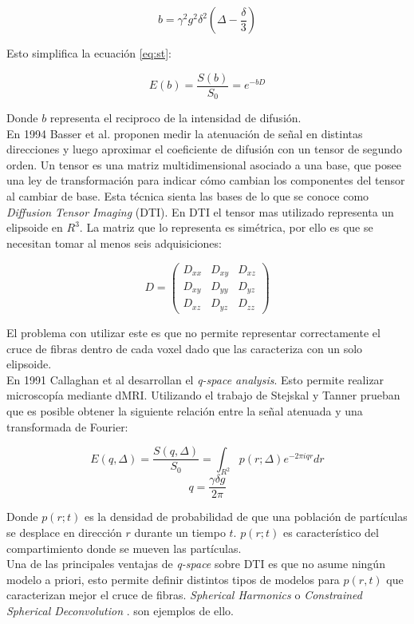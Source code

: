 $$ b = \gamma^2 g^2 \delta^2 \left(\Delta - \frac{\delta}{3}\right) $$ 

Esto simplifica la ecuaci\'on \ref{eq:st}:  

$$ E(b) = \frac{S(b)}{S_0} = e^{-b D} $$

Donde $b$ representa el reciproco de la intensidad de difusi\'on. \\

En 1994 Basser et al. \cite{Basser1994} proponen medir la atenuaci\'on de se\~nal
en distintas direcciones y luego aproximar el coeficiente de difusi\'on con un 
tensor de segundo orden. Un tensor es una matriz multidimensional asociado a una
base, que posee una ley de transformaci\'on  para indicar  c\'omo cambian los 
componentes del tensor al cambiar de base. Esta t\'ecnica sienta las bases de lo
que se conoce como \textit{Diffusion Tensor Imaging} (DTI). En DTI el tensor 
mas utilizado representa un elipsoide en $R^3$. La matriz que lo representa
es  sim\'etrica, por ello es que se necesitan tomar al menos seis adquisiciones: 

$$
    D =
    \begin{pmatrix}
             D_{xx} & D_{xy} & D_{xz} \\
             D_{xy} & D_{yy} & D_{yz} \\
             D_{xz} & D_{yz} & D_{zz}    
    \end{pmatrix}
$$

\vspace{0.1cm}

El problema con utilizar este es que no permite representar correctamente
el cruce de fibras dentro de cada voxel dado que las caracteriza con un solo
elipsoide.\\

En 1991 Callaghan et al \cite{Callaghan1991} desarrollan el \textit{q-space analysis}.
Esto permite realizar microscop\'ia mediante dMRI. Utilizando el trabajo de Stejskal
y Tanner prueban que es posible obtener la siguiente relaci\'on entre la se\~nal
atenuada y una transformada de Fourier:

$$E(q,\Delta) =  \frac{S(q,\Delta)}{S_0} = \int_{R^2}{p(r;\Delta)e^{-2\pi i q r} dr} $$
$$ q = \frac{\gamma \delta g}{2\pi} $$

Donde $p(r;t)$ es la densidad de probabilidad de que una poblaci\'on de 
part\'iculas se desplace en direcci\'on $r$ durante un tiempo $t$. $p(r;t)$ es
caracter\'istico del compartimiento donde se mueven las part\'iculas. \\

Una de las principales ventajas de \textit{q-space} sobre DTI es que no asume
ning\'un modelo a priori, esto permite definir distintos tipos de modelos para
$p(r,t)$ que caracterizan mejor el cruce de fibras. \textit{Spherical Harmonics}
\cite{Tuch2004} o \textit{Constrained Spherical Deconvolution} \cite{Tournier2004}.
son ejemplos de ello.

